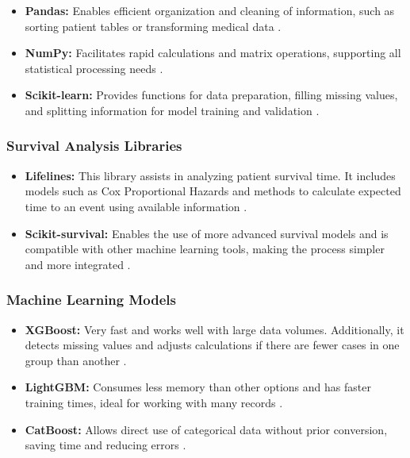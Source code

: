 \begin{itemize}
    \item \textbf{Pandas:} Enables efficient organization and cleaning of information, such as sorting patient tables or transforming medical data \cite{geeksforgeeks_pandas}.
    
    \item \textbf{NumPy:} Facilitates rapid calculations and matrix operations, supporting all statistical processing needs \cite{dataquest_numpy}.
    
    \item \textbf{Scikit-learn:} Provides functions for data preparation, filling missing values, and splitting information for model training and validation \cite{pushkarna_preprocessing}.
\end{itemize}

\subsubsection{Survival Analysis Libraries}

\begin{itemize}
    \item \textbf{Lifelines:} This library assists in analyzing patient survival time. It includes models such as Cox Proportional Hazards and methods to calculate expected time to an event using available information \cite{lifelines_docs}.
    
    \item \textbf{Scikit-survival:} Enables the use of more advanced survival models and is compatible with other machine learning tools, making the process simpler and more integrated \cite{scikit_survival_intro}.
\end{itemize}

\subsubsection{Machine Learning Models}

\begin{itemize}
    \item \textbf{XGBoost:} Very fast and works well with large data volumes. Additionally, it detects missing values and adjusts calculations if there are fewer cases in one group than another \cite{neptune_boosting}.
    
    \item \textbf{LightGBM:} Consumes less memory than other options and has faster training times, ideal for working with many records \cite{cienciadedatos_forecast}.
    
    \item \textbf{CatBoost:} Allows direct use of categorical data without prior conversion, saving time and reducing errors \cite{geeksforgeeks_boosting}.
\end{itemize}

